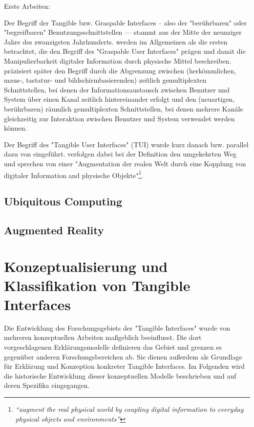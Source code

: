 Erste Arbeiten: \citep{Wellner93a} \citep{Suzuki95}

Der Begriff der Tangible bzw. Graspable Interfaces – also der "berührbaren" oder "begreifbaren" Benutzungsschnittstellen — stammt aus der Mitte der neunziger Jahre des zwanzigsten Jahrhunderts. \citet{Fitzmaurice95} werden im Allgemeinen als die ersten betrachtet, die den Begriff des "Graspable User Interfaces" prägen und damit die Manipulierbarkeit digitaler Information durch physische Mittel beschreiben. \citet{Fitzmaurice96} präzisiert später den Begriff durch die Abgrenzung zwischen (herkömmlichen, maus-, tastatur- und bildschirmbasierenden) zeitlich gemultiplexten Schnittstellen, bei denen der Informationsaustausch zwischen Benutzer und System über einen Kanal zeitlich hintereinander erfolgt und den (neuartigen, berührbaren) räumlich gemultiplexten Schnittstellen, bei denen mehrere Kanäle gleichzeitig zur Interaktion zwischen Benutzer und System verwendet werden können. 

Der Begriff des "Tangible User Interfaces" (TUI) wurde kurz danach bzw. parallel dazu von \citet{Ishii97} eingeführt. \citeauthor{Ishii97} verfolgen dabei bei der Definition den umgekehrten Weg und sprechen von einer "Augmentation der realen Welt durch eine Kopplung von digitaler Information and physische Objekte"\footnote{\emph{“augment the real physical world by coupling digital information to everyday physical objects and environments”}\citep{Ishii97}}. 

\subsection{Ubiquitous Computing}

\subsection{Augmented Reality} 


\section{Konzeptualisierung und Klassifikation von Tangible Interfaces} %
\label{sec:konzeptualisierungen_von_tangible_interfaces}

Die Entwicklung des Forschungsgebiets der "Tangible Interfaces" wurde von mehreren konzeptuellen Arbeiten maßgeblich beeinflusst. Die dort vorgeschlagenen Erklärungsmodelle definieren das Gebiet und grenzen es gegenüber anderen Forschungsbereichen ab. Sie dienen außerdem als Grundlage für Erklärung und Konzeption konkreter Tangible Interfaces. Im Folgenden wird die historische Entwicklung dieser konzeptuellen Modelle beschrieben und auf deren Spezifika eingegangen.

